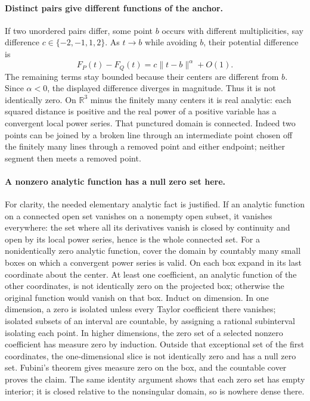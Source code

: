 \documentclass[11pt]{article}
\begin{document}
\paragraph{Distinct pairs give different functions of the anchor.}
If two unordered pairs differ, some point $b$ occurs with different
multiplicities, say difference $c\in\{-2,-1,1,2\}$.
As $t\to b$ while avoiding $b$, their potential difference is
\[
 F_P(t)-F_Q(t)=c\|t-b\|^\alpha+O(1).
\]
The remaining terms stay bounded because their centers are different from $b$.
Since $\alpha<0$, the displayed difference diverges in magnitude. Thus it is
not identically zero. On $\mathbb R^3$ minus the finitely many centers it is
real analytic: each squared distance is positive and the real power of a
positive variable has a convergent local power series. That punctured domain
is connected. Indeed two points can be joined by a broken line through an
intermediate point chosen off the finitely many lines through a removed point
and either endpoint; neither segment then meets a removed point.

\paragraph{A nonzero analytic function has a null zero set here.}
For clarity, the needed elementary analytic fact is justified. If an analytic
function on a connected open set vanishes on a nonempty open subset, it vanishes
everywhere: the set where all its derivatives vanish is closed by continuity
and open by its local power series, hence is the whole connected set.
For a nonidentically zero analytic function, cover the domain by countably many
small boxes on which a convergent power series is valid. On each box expand
in its last coordinate about the center. At least one coefficient, an analytic
function of the other coordinates, is not identically zero on the projected box;
otherwise the original function would vanish on that box.
Induct on dimension. In one dimension, a zero is isolated unless every Taylor
coefficient there vanishes; isolated subsets of an interval are countable, by
assigning a rational subinterval isolating each point. In higher dimensions,
the zero set of a selected nonzero coefficient has measure zero by induction.
Outside that exceptional set of the first coordinates, the one-dimensional
slice is not identically zero and has a null zero set. Fubini's theorem gives
measure zero on the box, and the countable cover proves the claim.
The same identity argument shows that each zero set has empty interior; it is
closed relative to the nonsingular domain, so is nowhere dense there.
\end{document}
